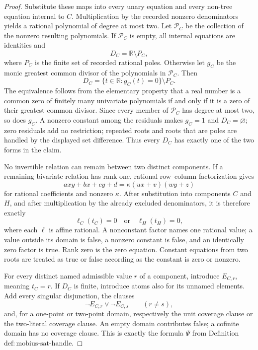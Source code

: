 \documentclass{article}
\begin{document}
\begin{proof}
Substitute these maps into every unary equation and every non-tree equation internal to \(C\).  Multiplication by the recorded nonzero denominators yields a rational polynomial of degree at most two.  Let \(\mathcal P_C\) be the collection of the nonzero resulting polynomials.  If \(\mathcal P_C\) is empty, all internal equations are identities and
\[
D_C=\mathbb R\setminus P_C,
\]
where \(P_C\) is the finite set of recorded rational poles.  Otherwise let \(g_C\) be the monic greatest common divisor of the polynomials in \(\mathcal P_C\).  Then
\[
D_C=\{t\in\mathbb R:g_C(t)=0\}\setminus P_C.
\]
The equivalence follows from the elementary property that a real number is a common zero of finitely many univariate polynomials if and only if it is a zero of their greatest common divisor.  Since every member of \(\mathcal P_C\) has degree at most two, so does \(g_C\).  A nonzero constant among the residuals makes \(g_C=1\) and \(D_C=\varnothing\); zero residuals add no restriction; repeated roots and roots that are poles are handled by the displayed set difference.  Thus every \(D_C\) has exactly one of the two forms in the claim.

No invertible relation can remain between two distinct components.  If a remaining bivariate relation has rank one, rational row--column factorization gives
\[
axy+bx+cy+d=\kappa(ux+v)(wy+z)
\]
for rational coefficients and nonzero \(\kappa\).  After substitution into components \(C\) and \(H\), and after multiplication by the already excluded denominators, it is therefore exactly
\[
\ell_C(t_C)=0\quad\text{or}\quad \ell_H(t_H)=0,
\]
where each \(\ell\) is affine rational.  A nonconstant factor names one rational value; a value outside its domain is false, a nonzero constant is false, and an identically zero factor is true.  Rank zero is the zero equation.  Constant equations from two roots are treated as true or false according as the constant is zero or nonzero.

For every distinct named admissible value \(r\) of a component, introduce \(E_{C,r}\), meaning \(t_C=r\).  If \(D_C\) is finite, introduce atoms also for its unnamed elements.  Add every singular disjunction, the clauses
\[
\neg E_{C,r}\lor\neg E_{C,s}\qquad(r\ne s),
\]
and, for a one-point or two-point domain, respectively the unit coverage clause or the two-literal coverage clause.  An empty domain contributes false; a cofinite domain has no coverage clause.  This is exactly the formula \(\Psi\) from Definition~\(\mathrm{def:mobius\mbox{-}sat\mbox{-}handle}\).


\end{proof}
\end{document}
